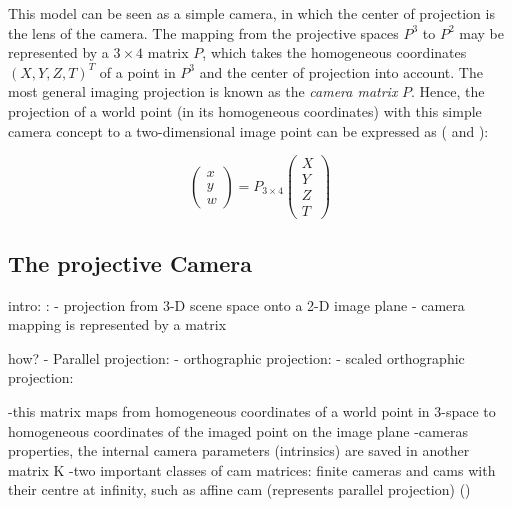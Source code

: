 This model can be seen as a simple camera, in which the center of projection is the lens of the camera. The mapping from the projective spaces $P^3$ to $P^2$ may be represented by a $3\times4$ matrix $P$, which takes the homogeneous coordinates $(X,Y,Z,T)^T$ of a point in $P^3$ and the center of projection into account. The most general imaging projection is known as the \textit{camera matrix} $P$. Hence, the projection of a world point (in its homogeneous coordinates) with this simple camera concept to a two-dimensional image point can be expressed as (\cite[p.7]{Hartley.2011} and \cite[p.42 et seqq.]{Szeliski.2011}):

\begin{equation} 
 \begin{pmatrix}
  x \\
  y \\
  w
 \end{pmatrix} = P_{3\times4}
 \begin{pmatrix}
  X \\
  Y \\
  Z \\
  T
 \end{pmatrix}
\end{equation}

\subsection{The projective Camera}
intro:  \cite[p.158]{Hartley.2011}: 
- projection from 3-D scene space onto a 2-D image plane
- camera mapping is represented by a matrix

how? 
- Parallel projection: \cite[p.170]{Hartley.2011}
- orthographic projection: \cite[p.171]{Hartley.2011}
- scaled orthographic projection: \cite[p.171]{Hartley.2011}



-this matrix maps from homogeneous coordinates of a world point in 3-space to homogeneous coordinates of the imaged point on the image plane
-cameras properties, the internal camera parameters (intrinsics) are saved in another matrix K
-two important classes of cam matrices: finite cameras and cams with their centre at infinity, such as affine cam (represents parallel projection)
 (\cite[p.152]{Hartley.2011})

